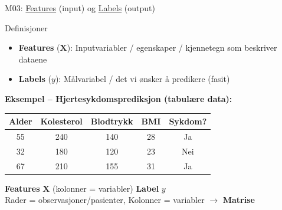 \documentclass[aspectratio=169, 10pt]{beamer}
\begin{document}
\begin{frame}{M03: \href{https://en.wikipedia.org/wiki/Feature_(machine_learning)}{Features} (input) og \href{https://en.wikipedia.org/wiki/Labeled_data}{Labels} (output)}

    \begin{block}{\footnotesize Definisjoner}
        \footnotesize
        \begin{itemize}
            \item \textbf{Features} ($\mathbf{X}$): Inputvariabler / egenskaper / kjennetegn som beskriver dataene
            \item \textbf{Labels} ($y$): Målvariabel / det vi ønsker å predikere (fasit)
        \end{itemize}
    \end{block}

    \vspace{2mm}
    \textbf{Eksempel -- Hjertesykdomsprediksjon (tabulære data):}

    \begin{table}
        \centering
        \footnotesize
        \begin{tabular}{cccc|c}
            \toprule
            \textbf{Alder} & \textbf{Kolesterol} & \textbf{Blodtrykk} & \textbf{BMI} & \textbf{Sykdom?} \\
            \midrule
            55 & 240 & 140 & 28 & Ja \\
            32 & 180 & 120 & 23 & Nei \\
            67 & 210 & 155 & 31 & Ja \\
            \bottomrule
        \end{tabular}
    \end{table}

    \begin{center}
        \footnotesize
        \textcolor{uibblue}{\textbf{Features} $\mathbf{X}$ (kolonner = variabler)} \hspace{1cm} \textcolor{uibred}{\textbf{Label} $y$}\\
        Rader = observasjoner/pasienter, Kolonner = variabler $\rightarrow$ \textbf{Matrise}
    \end{center}

\end{frame}
\end{document}
